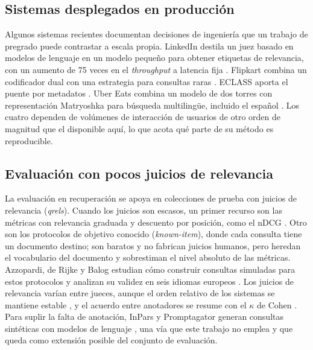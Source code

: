 \documentclass[11pt,letterpaper]{article}
\numberwithin{equation}{section}
\begin{document}
\subsection{Sistemas desplegados en producción}
\label{sec:ea-produccion}
Algunos sistemas recientes documentan decisiones de ingeniería que un trabajo de pregrado puede contrastar a escala propia. LinkedIn destila un juez basado en modelos de lenguaje en un modelo pequeño para obtener etiquetas de relevancia, con un aumento de 75 veces en el \textit{throughput} a latencia fija \cite{borisyuk2026linkedin}. Flipkart combina un codificador dual con una estrategia para consultas raras \cite{kothari2026flipkart}. ECLASS aporta el puente por metadatos \cite{baumgart2026eclass}. Uber Eats combina un modelo de dos torres con representación Matryoshka para búsqueda multilingüe, incluido el español \cite{ling2026ubereats}. Los cuatro dependen de volúmenes de interacción de usuarios de otro orden de magnitud que el disponible aquí, lo que acota qué parte de su método es reproducible.

\subsection{Evaluación con pocos juicios de relevancia}
\label{sec:ea-evaluacion}
La evaluación en recuperación se apoya en colecciones de prueba con juicios de relevancia (\textit{qrels}). Cuando los juicios son escasos, un primer recurso son las métricas con relevancia graduada y descuento por posición, como el nDCG \cite{jarvelin2002ndcg}. Otro son los protocolos de objetivo conocido (\textit{known-item}), donde cada consulta tiene un documento destino; son baratos y no fabrican juicios humanos, pero heredan el vocabulario del documento y sobrestiman el nivel absoluto de las métricas. Azzopardi, de Rijke y Balog estudian cómo construir consultas simuladas para estos protocolos y analizan su validez en seis idiomas europeos \cite{azzopardi2007simulated}. Los juicios de relevancia varían entre jueces, aunque el orden relativo de los sistemas se mantiene estable \cite{voorhees2000variations}, y el acuerdo entre anotadores se resume con el $\kappa$ de Cohen \cite{cohen1960kappa}. Para suplir la falta de anotación, InPars y Promptagator generan consultas sintéticas con modelos de lenguaje \cite{bonifacio2022inpars,dai2023promptagator}, una vía que este trabajo no emplea y que queda como extensión posible del conjunto de evaluación.
\end{document}

